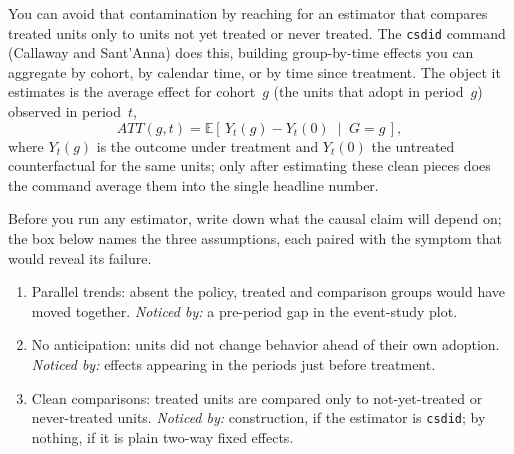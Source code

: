 You can avoid that contamination by reaching for an estimator that compares treated units only to units not yet treated or never treated. The \texttt{csdid} command (Callaway and Sant'Anna) does this, building group-by-time effects you can aggregate by cohort, by calendar time, or by time since treatment. The object it estimates is the average effect for cohort~$g$ (the units that adopt in period~$g$) observed in period~$t$,
\[
ATT(g,t)=\mathbb{E}\!\left[\,Y_t(g)-Y_t(0)\;\middle|\;G=g\,\right],
\]
where $Y_t(g)$ is the outcome under treatment and $Y_t(0)$ the untreated counterfactual for the same units; only after estimating these clean pieces does the command average them into the single headline number.

Before you run any estimator, write down what the causal claim will depend on; the box below names the three assumptions, each paired with the symptom that would reveal its failure.

\begin{restson}
\begin{enumerate}
\item Parallel trends: absent the policy, treated and comparison groups would have moved together. \emph{Noticed by:} a pre-period gap in the event-study plot.
\item No anticipation: units did not change behavior ahead of their own adoption. \emph{Noticed by:} effects appearing in the periods just before treatment.
\item Clean comparisons: treated units are compared only to not-yet-treated or never-treated units. \emph{Noticed by:} construction, if the estimator is \texttt{csdid}; by nothing, if it is plain two-way fixed effects.
\end{enumerate}
\end{restson}

